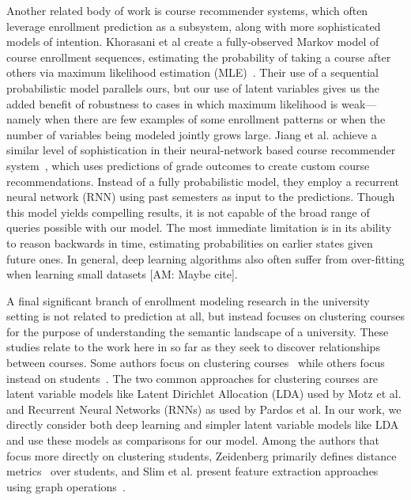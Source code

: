 \documentclass{edm_template}
\providecommand{\am}[1]{{\color{blue} [AM: #1]}}
\begin{document}
Another related body of work is course recommender systems, which often leverage enrollment prediction as a subsystem, along with more sophisticated models of intention. Khorasani et al create a fully-observed Markov model of course enrollment sequences, estimating the probability of taking a course after others via maximum likelihood estimation (MLE)~\cite{Khorasani2016AMC}. Their use of a sequential probabilistic model parallels ours, but our use of latent variables gives us the added benefit of robustness to cases in which maximum likelihood is weak---namely when there are few examples of some enrollment patterns or when the number of variables being modeled jointly grows large. Jiang et al. achieve a similar level of sophistication in their neural-network based course recommender system~\cite{Jiang2018GoalbasedCR}, which uses predictions of grade outcomes to create custom course recommendations. Instead of a fully probabilistic model, they employ a recurrent neural network (RNN) using past semesters as input to the predictions. Though this model yields compelling results, it is not capable of the broad range of queries possible with our model. The most immediate limitation is in its ability to reason backwards in time, estimating probabilities on earlier states given future ones. In general, deep learning algorithms also often suffer from over-fitting when learning small datasets \am{Maybe cite}. 

A final significant branch of enrollment modeling research in the university setting is not related to prediction at all, but instead focuses on clustering courses for the purpose of understanding the semantic landscape of a university. These studies relate to the work here in so far as they seek to discover relationships between courses. Some authors focus on clustering courses~\cite{Motz2018FindingTI}\cite{Pardos2018AMO} while others focus instead on students~\cite{Zeidenberg2011TheCO}\cite{Slim2016TheIO}. The two common approaches for clustering courses are latent variable models like Latent Dirichlet Allocation (LDA) used by Motz et al. and Recurrent Neural Networks (RNNs) as used by Pardos et al. In our work, we directly consider both deep learning and simpler latent variable models like LDA and use these models as comparisons for our model. Among the authors that focus more directly on clustering students, Zeidenberg primarily defines distance metrics~\cite{Zeidenberg2011TheCO} over students, and Slim et al. present feature extraction approaches using graph operations~\cite{Slim2016TheIO}. 
\end{document}
